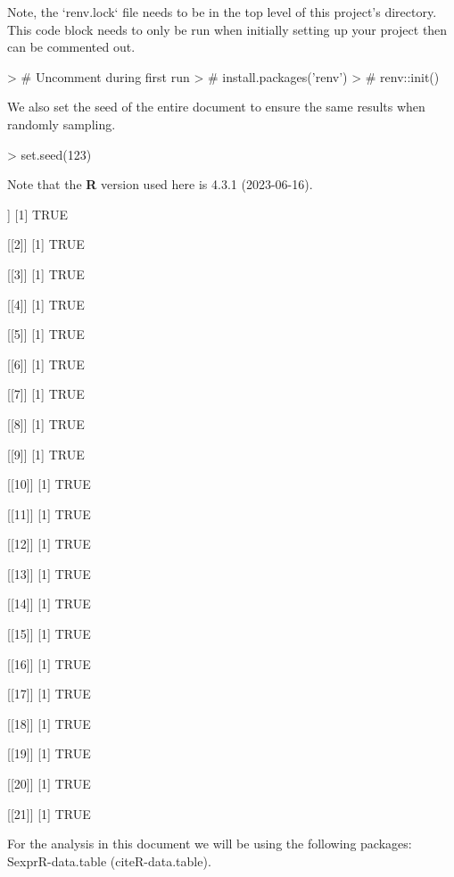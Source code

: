 \documentclass{article}
\begin{document}
Note, the `renv.lock` file needs to be in the top level of this project's directory. This code block needs to only be run when initially setting up your project then can be commented out.

\begin{Schunk}
\begin{Sinput}
> # Uncomment during first run
> # install.packages('renv')
> # renv::init()
\end{Sinput}
\end{Schunk}

We also set the seed of the entire document to ensure the same results when randomly sampling.

\begin{Schunk}
\begin{Sinput}
> set.seed(123)
\end{Sinput}
\end{Schunk}


Note that the \textbf{R} version used here is 4.3.1 (2023-06-16).


\begin{Schunk}
\begin{Soutput}
[[1]]
[1] TRUE

[[2]]
[1] TRUE

[[3]]
[1] TRUE

[[4]]
[1] TRUE

[[5]]
[1] TRUE

[[6]]
[1] TRUE

[[7]]
[1] TRUE

[[8]]
[1] TRUE

[[9]]
[1] TRUE

[[10]]
[1] TRUE

[[11]]
[1] TRUE

[[12]]
[1] TRUE

[[13]]
[1] TRUE

[[14]]
[1] TRUE

[[15]]
[1] TRUE

[[16]]
[1] TRUE

[[17]]
[1] TRUE

[[18]]
[1] TRUE

[[19]]
[1] TRUE

[[20]]
[1] TRUE

[[21]]
[1] TRUE
\end{Soutput}
\end{Schunk}


 
For the analysis in this document we will be using the following packages: Sexpr{R-data.table} (cite{R-data.table}).
\end{document}

